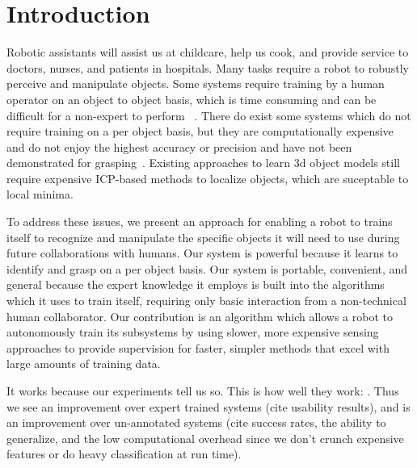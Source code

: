 \documentclass[conference]{IEEEtran}
\begin{document}

\section{Introduction}
Robotic assistants will assist us at childcare, help us cook, and
provide service to doctors, nurses, and patients in hospitals. Many
tasks require a robot to robustly perceive and manipulate objects.
Some systems require training by a human operator on an object to
object basis, which is time consuming and can be difficult for a
non-expert to perform ~\citep{ork14, lai11, lai11a}. There do exist
some systems which do not require training on a per object basis, but
they are computationally expensive and do not enjoy the highest
accuracy or precision and have not been demonstrated for
grasping~\citep{saxena08}.  Existing approaches to learn 3d object
models still require expensive ICP-based methods to localize objects,
which are suceptable to local minima.  

To address these issues, we present an approach for enabling a robot
to trains itself to recognize and manipulate the specific objects it
will need to use during future collaborations with humans.  Our system
is powerful because it learns to identify and grasp on a per object
basis. Our system is portable, convenient, and general because the
expert knowledge it employs is built into the algorithms which it uses
to train itself, requiring only basic interaction from a non-technical
human collaborator.  Our contribution is an algorithm which allows a
robot to autonomously train its subsystems by using slower, more
expensive sensing approaches to provide supervision for faster,
simpler methods that excel with large amounts of training data.


It works because our experiments tell us so. This is how well they
work: .  Thus we see an improvement over expert trained systems (cite
usability results), and is an improvement over un-annotated systems
(cite success rates, the ability to generalize, and the low
computational overhead since we don't crunch expensive features or do
heavy classification at run time).
\end{document}
